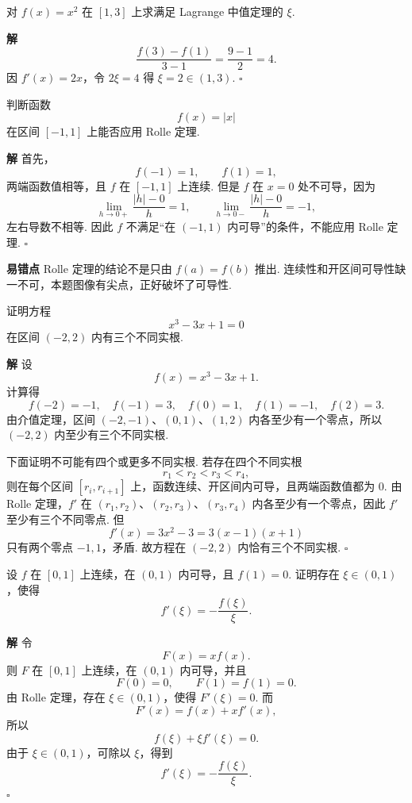 \documentclass[fontset=fandol]{ctexart}
\newenvironment{solution}{\par\noindent\textbf{解}\quad}{\hfill$\square$\par\vspace{0.8em}}
\newenvironment{warning}{\par\noindent\textbf{易错点}\quad}{\par\vspace{0.8em}}
\begin{document}
\begin{example}[验证中值定理]
对 $f(x)=x^2$ 在 $[1,3]$ 上求满足 Lagrange 中值定理的 $\xi$.
\end{example}
\begin{solution}
\[
\frac{f(3)-f(1)}{3-1}=\frac{9-1}{2}=4.
\]
因 $f'(x)=2x$，令 $2\xi=4$ 得 $\xi=2\in(1,3)$.
\end{solution}

\begin{example}
判断函数
\[
f(x)=|x|
\]
在区间 $[-1,1]$ 上能否应用 Rolle 定理.
\end{example}
\begin{solution}
首先，
\[
f(-1)=1,\qquad f(1)=1,
\]
两端函数值相等，且 $f$ 在 $[-1,1]$ 上连续. 但是 $f$ 在 $x=0$ 处不可导，因为
\[
\lim_{h\to0+}\frac{|h|-0}{h}=1,\qquad
\lim_{h\to0-}\frac{|h|-0}{h}=-1,
\]
左右导数不相等. 因此 $f$ 不满足“在 $(-1,1)$ 内可导”的条件，不能应用 Rolle 定理.
\end{solution}
\begin{warning}
Rolle 定理的结论不是只由 $f(a)=f(b)$ 推出. 连续性和开区间可导性缺一不可，本题图像有尖点，正好破坏了可导性.
\end{warning}

\begin{example}
证明方程
\[
x^3-3x+1=0
\]
在区间 $(-2,2)$ 内有三个不同实根.
\end{example}
\begin{solution}
设
\[
f(x)=x^3-3x+1.
\]
计算得
\[
f(-2)=-1,\quad f(-1)=3,\quad f(0)=1,\quad f(1)=-1,\quad f(2)=3.
\]
由介值定理，区间 $(-2,-1)$、$(0,1)$、$(1,2)$ 内各至少有一个零点，所以 $(-2,2)$ 内至少有三个不同实根.

下面证明不可能有四个或更多不同实根. 若存在四个不同实根
\[
r_1<r_2<r_3<r_4,
\]
则在每个区间 $[r_i,r_{i+1}]$ 上，函数连续、开区间内可导，且两端函数值都为 $0$. 由 Rolle 定理，$f'$ 在 $(r_1,r_2)$、$(r_2,r_3)$、$(r_3,r_4)$ 内各至少有一个零点，因此 $f'$ 至少有三个不同零点. 但
\[
f'(x)=3x^2-3=3(x-1)(x+1)
\]
只有两个零点 $-1,1$，矛盾. 故方程在 $(-2,2)$ 内恰有三个不同实根.
\end{solution}

\begin{example}[构造辅助函数]
设 $f$ 在 $[0,1]$ 上连续，在 $(0,1)$ 内可导，且 $f(1)=0$. 证明存在 $\xi\in(0,1)$，使得
\[
f'(\xi)=-\frac{f(\xi)}{\xi}.
\]
\end{example}
\begin{solution}
令
\[
F(x)=xf(x).
\]
则 $F$ 在 $[0,1]$ 上连续，在 $(0,1)$ 内可导，并且
\[
F(0)=0,\qquad F(1)=f(1)=0.
\]
由 Rolle 定理，存在 $\xi\in(0,1)$，使得 $F'(\xi)=0$. 而
\[
F'(x)=f(x)+xf'(x),
\]
所以
\[
f(\xi)+\xi f'(\xi)=0.
\]
由于 $\xi\in(0,1)$，可除以 $\xi$，得到
\[
f'(\xi)=-\frac{f(\xi)}{\xi}.
\]
\end{solution}
\end{document}
